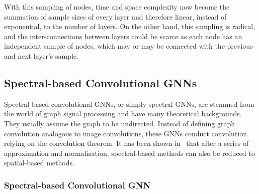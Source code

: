 With this sampling of nodes, time and space complexity now become the summation of sample sizes of every layer and therefore linear, instead of exponential, to the number of layers. On the other hand, this sampling is radical, and the inter-connections between layers could be scarce as each node has an independent sample of nodes, which may or may be connected with the previous and next layer's sample. 



\subsection{Spectral-based Convolutional GNNs}
\label{sec:spectral}
Spectral-based convolutional GNNs, or simply spectral GNNs, are stemmed from the world of graph signal processing and have many theoretical backgrounds. They usually assume the graph to be undirected. Instead of defining graph convolution analogous to image convolutions, these GNNs conduct convolution relying on the convolution theorem. It has been shown in~\cite{gcn} that after a series of approximation and normalization, spectral-based methods can also be reduced to spatial-based methods. 

\subsubsection{Spectral-based Convolutional GNN} \hfill \\

